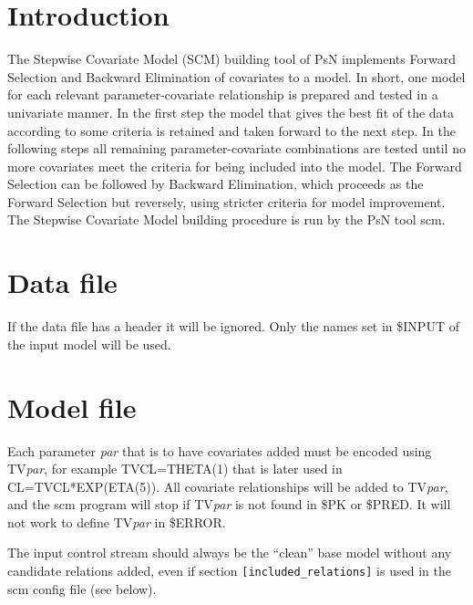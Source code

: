 



\maketitle
\newcommand{\guidetoolname}{scm}


\section{Introduction}

The Stepwise Covariate Model (SCM) building tool of PsN implements Forward Selection and Backward Elimination of 
covariates to a model. 
In short, one model for each relevant parameter-covariate relationship is prepared and tested in a univariate 
manner. 
In the first step the model that gives the best fit of the data according to some criteria is retained and taken 
forward to the next step. 
In the following steps all remaining parameter-covariate combinations are tested until no more covariates meet 
the criteria for being included into the model. The Forward Selection can be followed by Backward Elimination, 
which proceeds as the Forward Selection but reversely, using stricter criteria for model improvement. 
The Stepwise Covariate Model building procedure is run by the PsN tool scm. 

\section{Data file}
If the data file has a header it will be ignored. Only the names set in \$INPUT of the input model will be used.

\section{Model file}
Each parameter \emph{par} that is to have covariates added must be encoded using TV\emph{par}, 
for example TVCL=THETA(1) that is later used in CL=TVCL*EXP(ETA(5)). 
All covariate relationships will be added to TV\emph{par}, and the scm program will stop if TV\emph{par} 
is not found in \$PK or \$PRED. It will not work to define TV\emph{par} in \$ERROR.

The input control stream should always be the ``clean'' base model without any 
candidate relations added, even if section 
\verb|[included_relations]|
is used in the scm config file (see below). 

